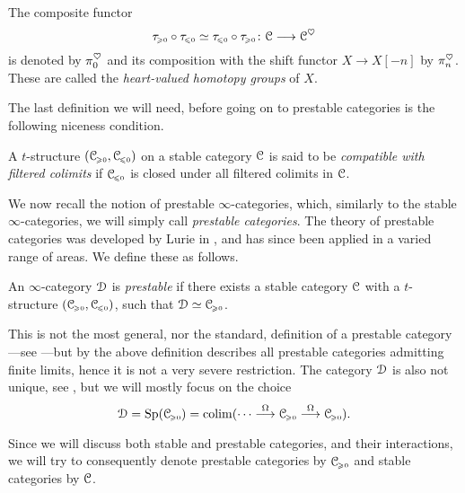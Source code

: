 \begin{definition}
    The composite functor 
    \[\tau_{\hspace{-1pt}\scriptscriptstyle\geqslant 0}\circ\tau_{\hspace{-1pt}\scriptscriptstyle\leqslant 0}\simeq\tau_{\hspace{-1pt}\scriptscriptstyle\leqslant 0}\circ\tau_{\hspace{-1pt}\scriptscriptstyle\geqslant 0} \colon \EuScript{C}\longrightarrow \EuScript{C}^\heartsuit\]
    is denoted by $\pi_0^\heartsuit$ and its composition with the shift functor $X\to X[-n]$ by $\pi_n^\heartsuit$. These are called the \emph{heart-valued homotopy groups} of $X$. 
\end{definition}

The last definition we will need, before going on to prestable categories is the following niceness condition. 

\begin{definition}
    A $t$-structure $(\EuScript{C}_{\hspace{-1pt}\scriptscriptstyle\geqslant 0}, \EuScript{C}_{\hspace{-1pt}\scriptscriptstyle\leqslant 0})$ on a stable category $\EuScript{C}$ is said to be \emph{compatible with filtered colimits} if $\EuScript{C}_{\hspace{-1pt}\scriptscriptstyle\leqslant 0}$ is closed under all filtered colimits in $\EuScript{C}$. 
\end{definition}

We now recall the notion of prestable $\infty$-categories, which, similarly to the stable $\infty$-categories, we will simply call \emph{prestable categories}. The theory of prestable categories was developed by Lurie in \cite[App. C]{lurie_SAG}, and has since been applied in a varied range of areas. We define these as follows. 

\begin{definition}
    An $\infty$-category $\EuScript{D}$ is \emph{prestable} if there exists a stable category $\EuScript{C}$ with a $t$-structure $(\EuScript{C}_{\hspace{-1pt}\scriptscriptstyle\geqslant 0}, \EuScript{C}_{\hspace{-1pt}\scriptscriptstyle\leqslant 0})$, such that $\EuScript{D}\simeq \EuScript{C}_{\hspace{-1pt}\scriptscriptstyle\geqslant 0}$.
\end{definition}

\begin{remark}
    This is not the most general, nor the standard, definition of a prestable category---see \cite[C.1.2.1]{lurie_SAG}---but by \cite[C.1.2.9]{lurie_SAG} the above definition describes all prestable categories admitting finite limits, hence it is not a very severe restriction. The category $\EuScript{D}$ is also not unique, see \cite[C.1.2.10]{lurie_SAG}, but we will mostly focus on the choice 
    \[\EuScript{D}=\mathrm{Sp}(\EuScript{C}_{\hspace{-1pt}\scriptscriptstyle\geqslant 0}) = \operatorname{colim} (\cdots\overset{\Omega}{\longrightarrow}\EuScript{C}_{\hspace{-1pt}\scriptscriptstyle\geqslant 0}\overset{\Omega}{\longrightarrow}\EuScript{C}_{\hspace{-1pt}\scriptscriptstyle\geqslant 0}).\]
\end{remark}

Since we will discuss both stable and prestable categories, and their interactions, we will try to consequently denote prestable categories by $\EuScript{C}_{\hspace{-1pt}\scriptscriptstyle\geqslant 0}$ and stable categories by $\EuScript{C}$. 

